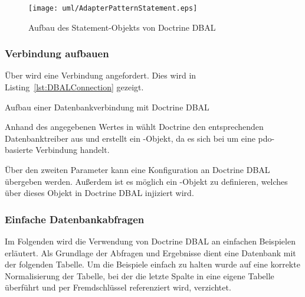 \begin{figure}[H]
	\centering
	\texttt{[image: uml/AdapterPatternStatement.eps]}
	\caption{Aufbau des Statement-Objekts von Doctrine DBAL}
	\label{fig:adpaterPatternStatement}
\end{figure}

\subsubsection{Verbindung aufbauen}
\label{basics:doctrine:subsubsec:createConnection}
Über  wird eine Verbindung angefordert. Dies wird in Listing~\ref{lst:DBALConnection} gezeigt.

\begin{listing}[H]
\caption{Aufbau einer Datenbankverbindung mit Doctrine DBAL}
\label{lst:DBALConnection}
\end{listing}

Anhand des angegebenen Wertes in  wählt Doctrine den entsprechenden Datenbanktreiber aus und erstellt ein -Objekt, da es sich bei  um eine \gls{pdo}-basierte Verbindung handelt.

Über den zweiten Parameter  kann eine Konfiguration an Doctrine DBAL übergeben werden. Außerdem ist es möglich ein -Objekt zu definieren, welches über dieses Objekt in Doctrine DBAL injiziert wird.

\subsubsection{Einfache Datenbankabfragen}
\label{basics:doctrine:subsubsec:simpleDatabaseQueries}

Im Folgenden wird die Verwendung von Doctrine DBAL an einfachen Beispielen erläutert. Als Grundlage der Abfragen und Ergebnisse dient eine Datenbank mit der folgenden Tabelle. Um die Beispiele einfach zu halten wurde auf eine korrekte Normalisierung der Tabelle, bei der die letzte Spalte in eine eigene Tabelle überführt und per Fremdschlüssel referenziert wird, verzichtet.

